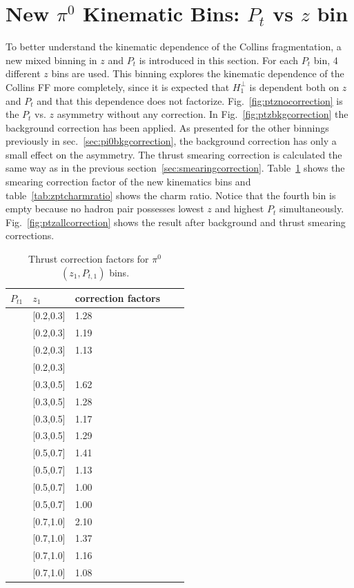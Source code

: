 \section{\texorpdfstring{New $\pi^0$ Kinematic Bins: $P_t$ vs $z$ bin}{New kinematic Bins: pt Vs z bin}}
\label{sec:newbins}
To better understand the kinematic dependence of the Collins fragmentation, a new mixed binning in $z$ and $P_t$ is introduced in this section. For each $P_t$ bin, 4 different $z$ bins are used. This binning explores the kinematic dependence of the Collins FF more completely, since it is expected that $H_1^{\bot}$ is dependent both on $z$ and $P_t$ and that this dependence does not factorize. Fig.~\ref{fig:ptznocorrection} is the $P_t$ vs. $z$ asymmetry without any correction. In Fig.~\ref{fig:ptzbkgcorrection} the background correction has been applied. As presented for the other binnings previously in sec.~\ref{sec:pi0bkgcorrection}, the background correction has only a small effect on the asymmetry. The thrust smearing correction is calculated the same way as in the previous section~\ref{sec:smearingcorrection}. Table~\ref{tab:16binsthrustfactor_compare} shows the smearing correction factor of the new kinematics bins and table~\ref{tab:zptcharmratio} shows the charm ratio. Notice that the fourth bin is empty because no hadron pair possesses lowest $z$ and highest $P_t$ simultaneously. Fig.~\ref{fig:ptzallcorrection} shows the result after background and thrust smearing corrections. 
\begin{table}[H]\footnotesize
\centering
\begin{tabular}{|l|l|l|l|l|}
\hline
$P_{t1}$  & $z_{1}$  & correction factors   \\ \hline
[0,0.15] & [0.2,0.3]	&		1.28	\\ \hline
[0.15,0.3] & [0.2,0.3] 	&		1.19	\\ \hline
[0.3,0.5]  & [0.2,0.3] 	&		1.13	\\ \hline
[0.5,3] & [0.2,0.3]  	&				\\ \hline
[0,0.15] & [0.3,0.5]	&		1.62	\\ \hline
[0.15,0.3] & [0.3,0.5] 	&		1.28	\\ \hline
[0.3,0.5] & [0.3,0.5] 	&		1.17	\\ \hline
[0.5,3.0] & [0.3,0.5] 	&		1.29	\\ \hline
[0,0.15] & [0.5,0.7] 	&		1.41	\\ \hline
[0.15,0.3] & [0.5,0.7] 	&		1.13	\\ \hline
[0.3,0.5] & [0.5,0.7]  	&		1.00	\\ \hline
[0.5,3.0] & [0.5,0.7]  	&		1.00	\\ \hline
[0,0.15] & [0.7,1.0]	&		2.10	\\ \hline
[0.15,0.5]   & [0.7,1.0] 	&		1.37	\\ \hline
[0.3,0.5]  & [0.7,1.0] 	&		1.16	\\ \hline
[0.5,3.0] & [0.7,1.0]	&		1.08	\\ \hline
\end{tabular}
\caption{Thrust correction factors for $\pi^0$ $(z_1,P_{t,1})$ bins.}
\label{tab:16binsthrustfactor_compare}
\end{table}


